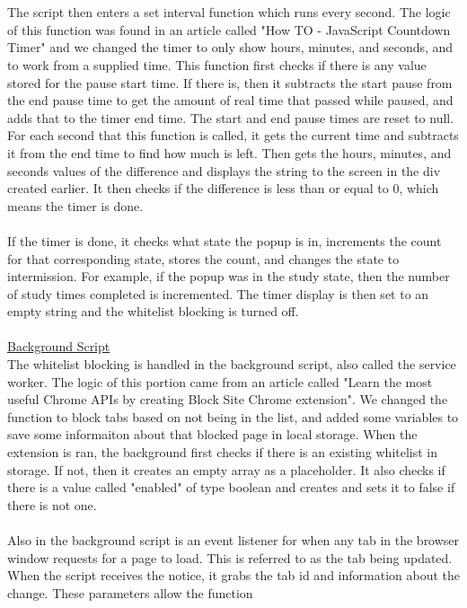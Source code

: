 \documentclass[12pt]{article}
\begin{document}
\\\\The script then enters a set interval function which runs every second. The logic of this function was found in an article called "How TO - JavaScript Countdown Timer" and we changed the timer to only show hours, minutes, and seconds, and to work from a supplied time. 
This function first checks if there is any value stored for the pause start time. If there is, 
then it subtracts the start pause from the end pause time to get the amount of real time that passed while paused, and adds that to the timer end time. 
The start and end pause times are reset to null. For each second that this function is called, it gets the current time and subtracts it from the 
end time to find how much is left. Then gets the hours, minutes, and seconds values of the difference and displays the string to the screen in the div created earlier. 
It then checks if the difference is less than or equal to 0, which means the timer is done. 
\\\\If the timer is done, it checks what state the popup is in, increments the count for that corresponding state, stores the count, and changes the state to intermission. 
For example, if the popup was in the study state, then the number of study times completed is incremented. The timer display is then set to an empty string and the whitelist blocking is turned off. 
\\\\
\underline{Background Script}\\
The whitelist blocking is handled in the background script, also called the service worker. The logic of this portion came from an article called "Learn the most useful Chrome APIs by creating Block Site Chrome extension". We changed the function to block tabs based on not being in the list, and added some variables to save some informaiton about that blocked page in local storage. 
When the extension is ran, the background first checks if there is an existing whitelist in storage. If not, then it creates an empty array as a placeholder. 
It also checks if there is a value called "enabled" of type boolean and creates and sets it to false if there is not one. 
\\\\Also in the background script is an event listener for when any tab in the browser window requests for a page to load. This is referred to as the tab being updated. 
When the script receives the notice, it grabs the tab id and information about the change. These parameters allow the function 
\end{document}
